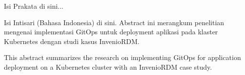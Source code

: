 \documentclass[skripsi,indonesia]{ugmskripsi}
\begin{document}
\cover
\titlepageind
\approvalpage
\declarepage
\motto
\acknowledment

\preface
{}
Isi Prakata di sini...

\tableofcontents
\listoftables
\listoffigures

\abstractind
Isi Intisari (Bahasa Indonesia) di sini. Abstract ini merangkum penelitian mengenai implementasi GitOps untuk deployment aplikasi pada klaster Kubernetes dengan studi kasus InvenioRDM.
\endabstractind

\abstracteng
This abstract summarizes the research on implementing GitOps for application deployment on a Kubernetes cluster with an InvenioRDM case study.
\endabstracteng










\appendix

\end{document}

